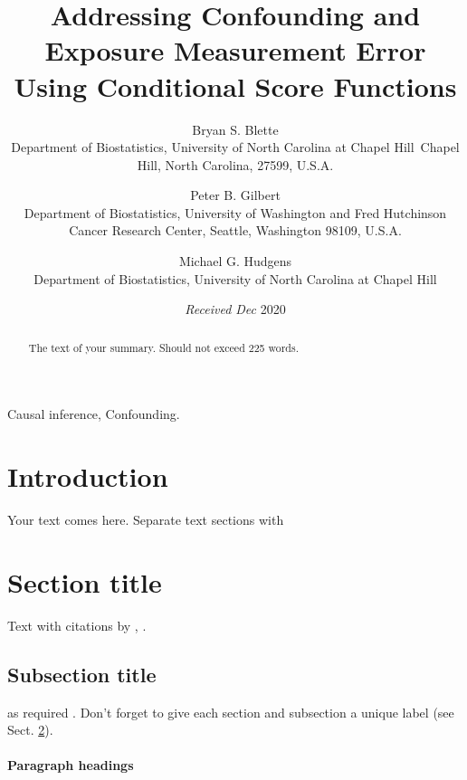 \documentclass[useAMS,usenatbib,referee]{biom}
\title[]{Addressing Confounding and Exposure Measurement Error Using Conditional
Score Functions}
\author{ Bryan S. Blette \email{\href{mailto:blette@live.unc.edu}{\nolinkurl{blette@live.unc.edu}}} \\ Department of Biostatistics, University of North Carolina at Chapel
Hill~Chapel Hill, North Carolina, 27599, U.S.A.  \and
		 Peter B. Gilbert \email{} \\ Department of Biostatistics, University of Washington and Fred
Hutchinson Cancer Research Center, Seattle, Washington 98109, U.S.A.  \and
		 Michael G. Hudgens \email{} \\ Department of Biostatistics, University of North Carolina at Chapel Hill 
	   }
\begin{document}
\date{{\it Received Dec} 2020}

\pagerange{\pageref{firstpage}--\pageref{lastpage}} 



\label{firstpage}


\begin{abstract}
The text of your summary. Should not exceed 225 words.
\end{abstract}

%
%

\begin{keywords}
Causal inference, Confounding.
\end{keywords}

\maketitle

\hypertarget{intro}{%
\section{Introduction}\label{intro}}

Your text comes here. Separate text sections with

\hypertarget{sec:1}{%
\section{Section title}\label{sec:1}}

Text with citations by \citet{heagerty2000time},
\citep{pepe2003statistical}.

\hypertarget{sec:2}{%
\subsection{Subsection title}\label{sec:2}}

as required \citep{hoerl1970ridge, zou2005regularization}. Don't forget
to give each section and subsection a unique label (see Sect.
\ref{sec:1}).

\hypertarget{paragraph-headings}{%
\paragraph{Paragraph headings}\label{paragraph-headings}}
\end{document}
